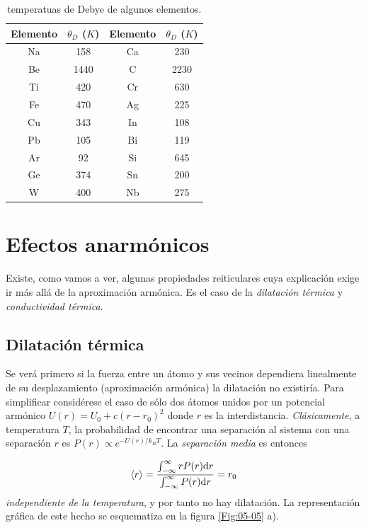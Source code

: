 \begin{table}[h!] \centering
\begin{tabular}{cccc}
    Elemento & $\theta_D$ ($K$) & Elemento & $\theta_D$ ($K$) \\ \hline
    Na & 158 & Ca & 230 \\
    Be & 1440 & C & 2230 \\
    Ti & 420 & Cr & 630 \\
    Fe & 470 & Ag & 225 \\
    Cu & 343 & In & 108 \\
    Pb & 105 & Bi & 119 \\
    Ar & 92 & Si & 645 \\
    Ge & 374 & Sn & 200 \\
    W & 400 & Nb & 275
\end{tabular}
\caption{temperatuas de Debye de algunos elementos.}
\label{Tab:05-01}
\end{table}

\section{Efectos anarmónicos}

Existe, como vamos a ver, algunas propiedades reiticulares cuya explicación exige ir más allá de la aproximación armónica. Es el caso de la \textit{dilatación térmica} y  \textit{conductividad térmica}.

\subsection{Dilatación térmica}

Se verá primero si la fuerza entre un átomo y sus vecinos dependiera linealmente de su desplazamiento (aproximación armónica) la dilatación no existiría. Para simplificar considérese el caso de sólo dos átomos unidos por un potencial armónico $U(r) = U_0 + c(r-r_0)^2$ donde $r$ es la interdistancia. \textit{Clásicamente}, a temperatura $T$, la probabilidad de encontrar una separación al sistema con una separación $r$ es $P(r)\propto e^{-U(r)/k_BT}$. La \textit{separación media} es entonces

\begin{equation}
    \langle r \rangle = \frac{\int_{-\infty}^{\infty} r P(r)\mathrm{d} r}{\int_{-\infty}^{\infty} P(r)\mathrm{d} r} = r_0 \label{Ec:05-03-01}
\end{equation}
\textit{independiente de la temperatura}, y por tanto no hay dilatación. La representación gráfica de este hecho se esquematiza en la figura \ref{Fig:05-05} a). 

